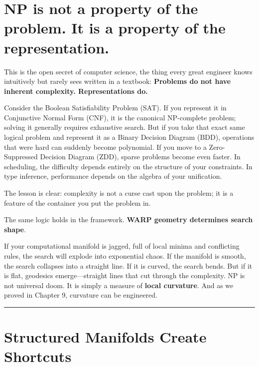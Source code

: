 \section{\texorpdfstring{\textbf{NP is not a property of the problem. It is a property of the representation.}}{10.2 --- NP is not a property of the problem. It is a property of the representation.}}

This is the open secret of computer science, the thing every great engineer knows intuitively but rarely sees written in a textbook: \textbf{Problems do not have inherent complexity. Representations do.}

Consider the Boolean Satisfiability Problem (SAT). If you represent it in Conjunctive Normal Form (CNF), it is the canonical NP-complete problem; solving it generally requires exhaustive search. But if you take that exact same logical problem and represent it as a Binary Decision Diagram (BDD), operations that were hard can suddenly become polynomial. If you move to a Zero-Suppressed Decision Diagram (ZDD), sparse problems become even faster. In scheduling, the difficulty depends entirely on the structure of your constraints. In type inference, performance depends on the algebra of your unification.

The lesson is clear: complexity is not a curse cast upon the problem; it is a feature of the container you put the problem in.

The same logic holds in the \COMPUTER{} framework. \textbf{WARP geometry determines search shape}.

If your computational manifold is jagged, full of local minima and conflicting rules, the search will explode into exponential chaos. If the manifold is smooth, the search collapses into a straight line. If it is curved, the search bends. But if it is flat, geodesics emerge—straight lines that cut through the complexity. NP is not universal doom. It is simply a measure of \textbf{local curvature}. And as we proved in Chapter 9, curvature can be engineered.

\begin{center}\rule{0.5\linewidth}{0.5pt}\end{center}

\section{\texorpdfstring{\textbf{Structured Manifolds Create Shortcuts}}{10.3 --- Structured Manifolds Create Shortcuts}}

